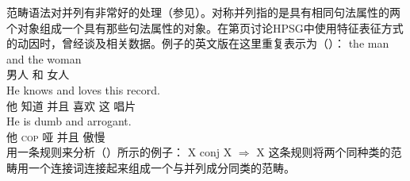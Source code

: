 \begin{exe}
\begin{xlist}[iv.]
\begin{exe}
\begin{xlist}[iv.]
范畴语法对并列有非常好的处理（参见\citet{Steedman91a}）。对称并列指的是具有相同句法属性的两个对象组成一个具有那些句法属性的对象。在第\pageref{Seite-HPSG-Koordination}页讨论HPSG中使用特征表征方式的动因时，曾经谈及相关数据。例子的英文版在这里重复表示为（）：
\eal
\ex 
\gll the man and the woman\\
      男人 和  女人\\
\ex 
\gll He knows and loves this record.\\
     他 知道 并且 喜欢 这 唱片\\
\ex 
\gll He is dumb and arrogant.\\
     他 \textsc{cop} 哑 并且  傲慢\\
\zl
 \citet{Steedman91a}用一条规则来分析（）所示的例子：
\ea
X conj X $\Rightarrow$ X
\z
这条规则将两个同种类的范畴用一个连接词连接起来组成一个与并列成分同类的范畴。

\end{xlist}
\end{exe}
\end{xlist}
\end{exe}
